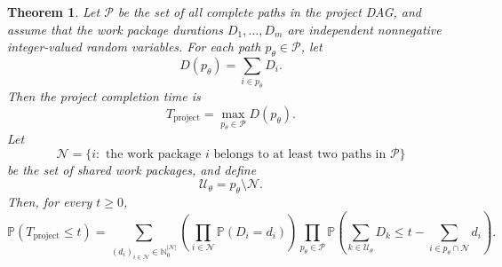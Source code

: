 \documentclass[11pt,a4paper]{article}
\newcommand{\pP}{\mathbb{P}}
\newcommand{\1}{\mathbf{1}}
\theoremstyle{definition}
\theoremstyle{plain}
\newtheorem{theorem}{Theorem}[section]
\theoremstyle{remark}
\numberwithin{equation}{section}
\begin{document}
\begin{theorem}
Let $\mathcal{P}$ be the set of all complete paths in the project DAG, and assume that the work package durations
$D_1,\ldots,D_m$ are independent nonnegative integer-valued random variables. For each path $p_\theta\in\mathcal{P}$, let
\[
D(p_\theta)=\sum_{i\in p_\theta}D_i.
\]
Then the project completion time is
\[
T_{\text{project}}=\max_{p_\theta\in\mathcal{P}} D(p_\theta).
\]
Let
\[
\mathcal{N}
=
\{i:\text{ the work package } i \text{ belongs to at least two paths in } \mathcal{P}\}
\]
be the set of shared work packages, and define
\[
\mathcal{U}_\theta=p_\theta\setminus \mathcal{N}.
\]
Then, for every $t\geq 0$,
\[
\pP(T_{\text{project}}\leq t)
=
\sum_{(d_i)_{i\in\mathcal{N}}\in \mathbb{N}_0^{|\mathcal{N}|}}
\left(
\prod_{i\in\mathcal{N}}\pP(D_i=d_i)
\right)
\prod_{p_\theta\in\mathcal{P}}
\pP\left(
\sum_{k\in\mathcal{U}_\theta}D_k
\leq
t-\sum_{i\in p_\theta\cap\mathcal{N}}d_i
\right).
\]
\end{theorem}
\end{document}
